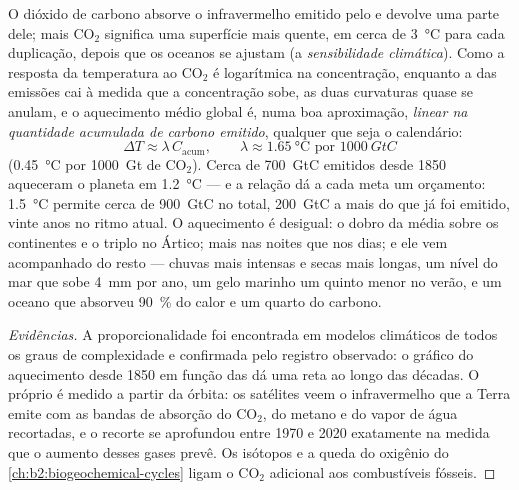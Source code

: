 \begin{proposition}\label{prop:b2:global-change:tcre}
O dióxido de carbono absorve o infravermelho emitido pelo  e devolve
uma parte dele; mais \ensuremath{\mathrm{CO_2}} significa uma superfície mais quente, em cerca de
\qty{3}{\celsius} para cada duplicação, depois que os oceanos se ajustam
(a \emph{sensibilidade climática}). Como a resposta da temperatura
ao \ensuremath{\mathrm{CO_2}} é logarítmica na concentração, enquanto a  das emissões cai à medida que a concentração sobe, as duas
curvaturas quase se anulam, e o aquecimento médio global é, numa boa
aproximação, \emph{linear na quantidade acumulada de
carbono emitido}, qualquer que seja o calendário:
\[
\Delta T \approx \lambda\,C_{\text{acum}}, \qquad \lambda \approx
\qty{1.65}{\celsius} \text{ por } \qty{1000}{GtC}
\]
(\qty{0.45}{\celsius} por \qty{1000}{Gt} de \ensuremath{\mathrm{CO_2}}). Cerca de
\qty{700}{GtC} emitidos desde 1850 aqueceram o planeta em
\qty{1.2}{\celsius} --- e a relação dá a cada meta um orçamento:
\qty{1.5}{\celsius} permite cerca de \qty{900}{GtC} no total,
\qty{200}{GtC} a mais do que já foi emitido, vinte anos no ritmo atual.
O aquecimento é desigual: o dobro da média sobre os continentes e o
triplo no Ártico; mais nas noites que nos dias; e ele vem acompanhado do
resto --- chuvas mais intensas e secas mais longas, um nível do mar que
sobe \qty{4}{mm} por ano, um gelo marinho um quinto menor no verão, e um
oceano que absorveu \qty{90}{\%} do calor e um quarto do carbono.
\end{proposition}
\begin{proof}[Evidências]
A proporcionalidade foi encontrada em modelos climáticos de todos os
graus de complexidade e confirmada pelo registro observado: o gráfico do
aquecimento desde 1850 em função das  dá uma reta ao
longo das décadas. O próprio  é medido a partir da órbita:
os satélites veem o infravermelho que a Terra emite com as bandas de
absorção do \ensuremath{\mathrm{CO_2}}, do metano e do vapor de água recortadas,
e o recorte se aprofundou entre 1970 e 2020 exatamente na medida que o
aumento desses gases prevê. Os isótopos e a queda do oxigênio do
\cref{ch:b2:biogeochemical-cycles} ligam o
\ensuremath{\mathrm{CO_2}} adicional aos combustíveis fósseis.
\end{proof}

